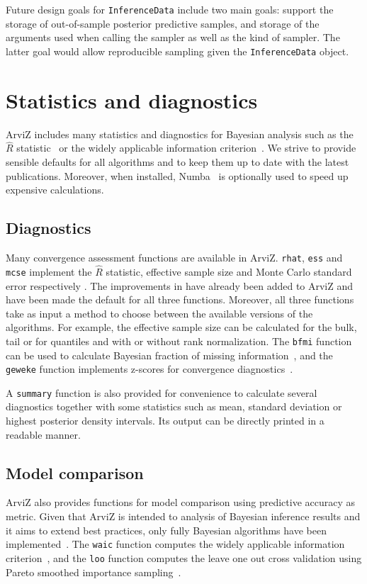 \documentclass[anonymous=false, %
               format=acmsmall, %
               review=true, %
               screen=true, %
               nonacm=true]{acmart}
\begin{document}
Future design goals for \texttt{InferenceData} include two main goals:
support the storage of out-of-sample posterior predictive samples,
and storage of the arguments used
when calling the sampler as well as the kind of sampler. The latter goal
would allow reproducible sampling given the \texttt{InferenceData} object.

\section{Statistics and diagnostics}\label{sec:stats}
ArviZ includes many statistics and diagnostics for Bayesian
analysis such as the $\hat{R}$ statistic~\cite{gelman1992rhat, vehtari2019rank} or the
widely applicable information criterion~\cite{watanabe2010waic}.
We strive to provide sensible defaults for all algorithms and to
keep them up to date with the latest publications. Moreover, when installed,
Numba~\cite{lam2015numba} is optionally used to
speed up expensive calculations.

\subsection{Diagnostics}
Many convergence assessment functions are available in ArviZ.
\texttt{rhat}, \texttt{ess} and \texttt{mcse}
implement the $\hat{R}$ statistic, effective sample size and Monte Carlo
standard error respectively \cite{gelman1992rhat, gelman2013bayesian}. %
The improvements in \citet{vehtari2019rank} have already been added to
ArviZ and have been made the default for all three functions. Moreover, all
three functions take
as input a method to choose between the available versions of the algorithms.
For example, the effective sample size can be calculated for the bulk, tail or for
quantiles and with or without rank normalization.
The \texttt{bfmi} function can be used to calculate Bayesian fraction
of missing information~\cite{betancourt2016diagnosing}, and the \texttt{geweke} function
implements z-scores for convergence diagnostics~\cite{geweke1991evaluating}.

A \texttt{summary} function is also provided for convenience to calculate
several diagnostics together with some statistics such as mean, standard deviation
or highest posterior density intervals.
Its output can be directly printed in a readable manner.

\subsection{Model comparison}
ArviZ also provides functions for model comparison using predictive
accuracy as metric. Given that ArviZ is intended to analysis of Bayesian
inference results and it aims to extend best practices, only fully
Bayesian algorithms have been implemented~\cite{gelman2014understanding}.
The \texttt{waic} function computes the
widely applicable information criterion~\cite{watanabe2010waic}, and the
\texttt{loo} function computes the leave one out cross validation using Pareto
smoothed importance sampling~\cite{vehtari2015pareto, vehtari2017practical}.
\end{document}
